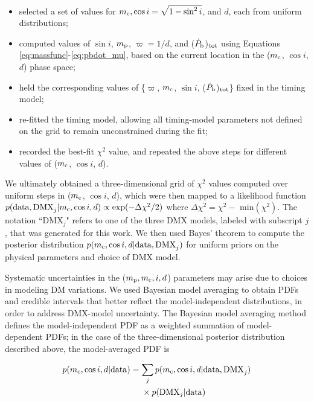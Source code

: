 \documentclass[twocolumn]{aastex63}
\newcommand{\pbdot}{$\dot{P}_{\rm b}$}
\begin{document}
\begin{itemize}
    \item selected a set of values for $m_{\rm c}, \cos i = \sqrt{1 - \sin^2i}$, and $d$, each from uniform distributions;
    \item computed values of $\sin i$, $m_{\rm p}$, $\varpi = 1/d$, and (\pbdot)$_{\rm tot}$ using Equations \ref{eq:massfunc}-\ref{eq:pbdot_mu}, based on the current location in the ($m_{\rm c}$, $\cos i$, $d$) phase space; 
    \item held the corresponding values of \{$\varpi$, $m_{\rm c}$, $\sin i$, (\pbdot)$_{\rm tot}$\} fixed in the timing model;
    \item re-fitted the timing model, allowing all timing-model parameters not defined on the grid to remain unconstrained during the fit;
    \item recorded the best-fit $\chi^2$ value, and repeated the above steps for different values of ($m_{\rm c}$, $\cos i$, $d$).
\end{itemize}

We ultimately obtained a three-dimensional grid of $\chi^2$ values computed over uniform steps in ($m_{\rm c}$, $\cos i$, $d$), which were then mapped to a likelihood function $p({\rm data, DMX}_j|m_{\rm c},\cos i, d) \propto \exp(-\Delta\chi^2/2)$ where $\Delta\chi^2 = \chi^2 - \textrm{ min}(\chi^2)$. The notation ``DMX$_j$" refers to one of the three DMX models, labeled with subscript $j$, that was generated for this work. We then used Bayes' theorem to compute the posterior distribution $p(m_{\rm c},\cos i, d|{\rm data, DMX}_j)$ for uniform priors on the physical parameters and choice of DMX model.

Systematic uncertainties in the ($m_{\rm p}, m_{\rm c}, i, d$) parameters may arise due to choices in modeling DM variations. We used Bayesian model averaging \citep[e.g.,][]{hmrv99} to obtain PDFs and credible intervals that better reflect the model-independent distributions, in order to address DMX-model uncertainty. The Bayesian model averaging method defines the model-independent PDF as a weighted summation of model-dependent PDFs; in the case of the three-dimensional posterior distribution described above, the model-averaged PDF is 

\begin{align}
    \label{eq:bma}
    p(m_{\rm c},\cos i, d|{\rm data}) &= \sum_j p(m_{\rm c},\cos i, d|{\rm data, DMX}_j) \nonumber \\
    &\phantom{{}={}} \times p({\rm DMX}_j|{\rm data})
\end{align}
\end{document}
